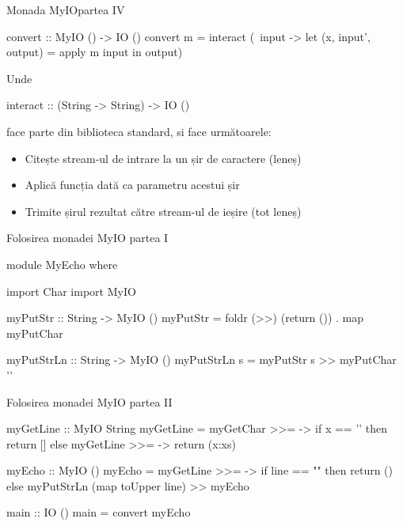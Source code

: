 \documentclass[xcolor=pdftex,romanian,colorlinks]{beamer}
\begin{document}
\begin{frame}[fragile]{Monada MyIO}{partea IV}
\begin{asciihs}
   convert :: MyIO () -> IO ()
   convert m = interact (\ input ->
                   let (x, input', output) = apply m input
                    in output)
\end{asciihs}

Unde
\begin{asciihs}
   interact :: (String -> String) -> IO ()
\end{asciihs}
face parte din biblioteca standard, si face următoarele:
\begin{itemize}
\item Citește stream-ul de intrare la un șir de caractere (leneș)
\item Aplică funcția dată ca parametru acestui șir
\item Trimite șirul rezultat către stream-ul de ieșire (tot leneș)
\end{itemize}
\end{frame}


%
%


\begin{frame}[fragile]{Folosirea monadei MyIO}
{partea I}
\begin{asciihs}
  module MyEcho where

  import Char
  import MyIO

  myPutStr :: String -> MyIO ()
  myPutStr = foldr (>>) (return ()) . map myPutChar

  myPutStrLn :: String -> MyIO ()
  myPutStrLn s = myPutStr s >> myPutChar '\n'
\end{asciihs}
\end{frame}



\begin{frame}[fragile]{Folosirea monadei MyIO}
{partea II}
\vspace{-2ex}
\begin{asciihs}
  myGetLine :: MyIO String
  myGetLine = myGetChar >>= \x ->
               if x == '\n' then
                 return []
               else
                 myGetLine >>= \xs ->
                 return (x:xs)

  myEcho :: MyIO ()
  myEcho = myGetLine >>= \line ->
            if line == "" then
              return ()
            else
              myPutStrLn (map toUpper line) >>
              myEcho

  main :: IO ()
  main = convert myEcho
\end{asciihs}
\end{frame}
\end{document}
